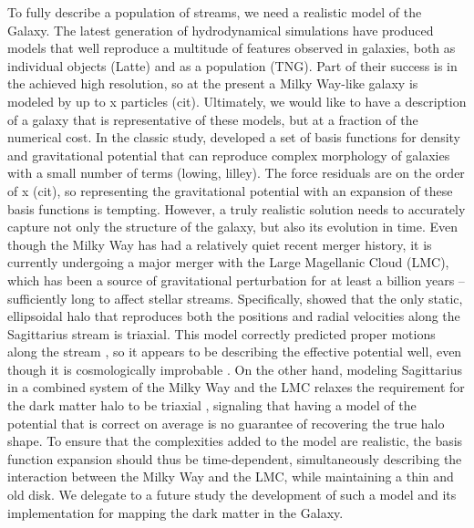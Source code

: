 \documentclass[modern]{aastex61}
\begin{document}
To fully describe a population of streams, we need a realistic model of the Galaxy.
The latest generation of hydrodynamical simulations have produced models that well reproduce a multitude of features observed in galaxies, both as individual objects (Latte) and as a population (TNG).
Part of their success is in the achieved high resolution, so at the present a Milky Way-like galaxy is modeled by up to x particles (cit).
Ultimately, we would like to have a description of a galaxy that is representative of these models, but at a fraction of the numerical cost.
In the classic study, \citet{ho} developed a set of basis functions for density and gravitational potential that can reproduce complex morphology of galaxies with a small number of terms (lowing, lilley).
The force residuals are on the order of x (cit), so representing the gravitational potential with an expansion of these basis functions is tempting.
However, a truly realistic solution needs to accurately capture not only the structure of the galaxy, but also its evolution in time.
Even though the Milky Way has had a relatively quiet recent merger history, it is currently undergoing a major merger with the Large Magellanic Cloud (LMC), which has been a source of gravitational perturbation for at least a billion years -- sufficiently long to affect stellar streams.
Specifically, \citet{lm10} showed that the only static, ellipsoidal halo that reproduces both the positions and radial velocities along the Sagittarius stream is triaxial.
This model correctly predicted proper motions along the stream \citep{sohn2015}, so it appears to be describing the effective potential well, even though it is cosmologically improbable \citep{debattista2013}.
On the other hand, modeling Sagittarius in a combined system of the Milky Way and the LMC relaxes the requirement for the dark matter halo to be triaxial \citep{vch2013}, signaling that having a model of the potential that is correct on average is no guarantee of recovering the true halo shape.
To ensure that the complexities added to the model are realistic, the basis function expansion should thus be time-dependent, simultaneously describing the interaction between the Milky Way and the LMC, while maintaining a thin and old disk. 
We delegate to a future study the development of such a model and its implementation for mapping the dark matter in the Galaxy.
\end{document}
